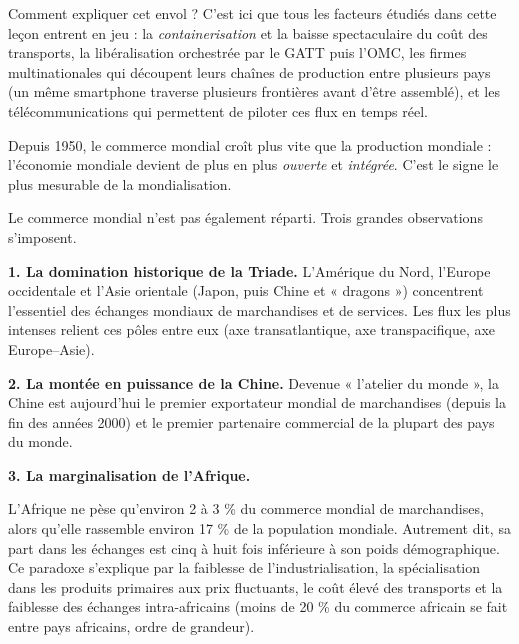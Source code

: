 \documentclass[11pt]{article}
\newcommand{\cle}[1]{{\popxbold\color{popdark}#1}}
\newcounter{popsec}
\newcounter{popsub}
\newcommand{\courssub}[1]{%
  \stepcounter{popsub}%
  \par\vspace{9pt}\noindent{\popxbold\fontsize{11.5}{13}\selectfont\color{popink}{\color{poporange}\thepopsec.\thepopsub}\hspace{6pt}#1}\par\nopagebreak\vspace{4pt}
}
\begin{document}
Comment expliquer cet envol ? C'est ici que tous les facteurs étudiés dans cette leçon entrent en jeu : la \emph{containerisation} et la baisse spectaculaire du coût des transports, la libéralisation orchestrée par le GATT puis l'OMC, les firmes multinationales qui découpent leurs chaînes de production entre plusieurs pays (un même smartphone traverse plusieurs frontières avant d'être assemblé), et les télécommunications qui permettent de piloter ces flux en temps réel.

\begin{aretenir}
Depuis 1950, le commerce mondial croît plus vite que la production mondiale : l'économie mondiale devient de plus en plus \emph{ouverte} et \emph{intégrée}. C'est le signe le plus mesurable de la mondialisation.
\end{aretenir}

\courssub{Une géographie inégale des échanges}

Le commerce mondial n'est pas également réparti. Trois grandes observations s'imposent.

\textbf{1. La domination historique de la Triade.} L'Amérique du Nord, l'Europe occidentale et l'Asie orientale (Japon, puis Chine et « dragons ») concentrent l'essentiel des échanges mondiaux de marchandises et de services. Les flux les plus intenses relient ces pôles entre eux (axe transatlantique, axe transpacifique, axe Europe--Asie).

\textbf{2. La montée en puissance de la Chine.} Devenue « l'atelier du monde », la Chine est aujourd'hui le premier exportateur mondial de marchandises (depuis la fin des années 2000) et le premier partenaire commercial de la plupart des pays du monde.

\textbf{3. La marginalisation de l'Afrique.}

\begin{exemplebox}
L'Afrique ne pèse qu'environ \cle{2 à 3 \%} du commerce mondial de marchandises, alors qu'elle rassemble environ \cle{17 \%} de la population mondiale. Autrement dit, sa part dans les échanges est cinq à huit fois inférieure à son poids démographique. Ce paradoxe s'explique par la faiblesse de l'industrialisation, la spécialisation dans les produits primaires aux prix fluctuants, le coût élevé des transports et la faiblesse des échanges intra-africains (moins de 20 \% du commerce africain se fait entre pays africains, ordre de grandeur).
\end{exemplebox}
\end{document}
